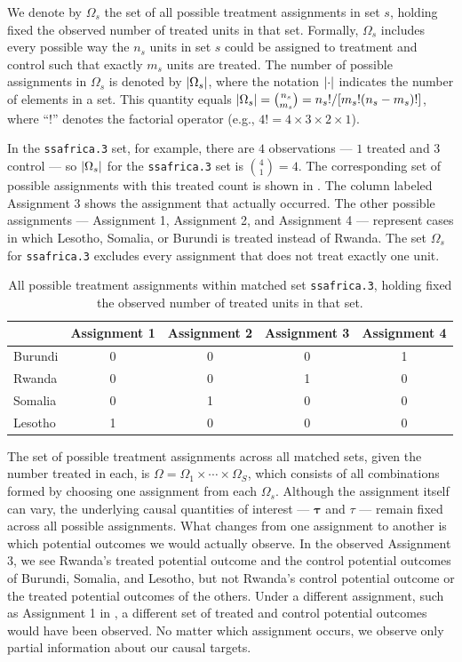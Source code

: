 \documentclass[twoside,11pt]{article}
\DeclarePairedDelimiter\abs{\lvert}{\rvert}
\begin{document}
We denote by \(\Omega_s\) the set of all possible treatment assignments
in set \(s\), holding fixed the observed number of treated units in that
set. Formally, \(\Omega_s\) includes every possible way the \(n_s\)
units in set \(s\) could be assigned to treatment and control such that
exactly \(m_s\) units are treated. The number of possible assignments in
\(\Omega_s\) is denoted by \(\abs{\Omega_s}\), where the notation
\(\abs{\cdot}\) indicates the number of elements in a set. This quantity
equals
\(\abs{\Omega_s} = \binom{n_s}{m_s} = n_s! / [m_s! (n_s - m_s)!]\),
where ``!'' denotes the factorial operator (e.g.,
\(4! = 4 \times 3 \times 2 \times 1\)).

In the \texttt{ssafrica.3} set, for example, there are \(4\)
observations --- \(1\) treated and \(3\) control --- so
\(\abs{\Omega_s}\) for the \texttt{ssafrica.3} set is
\(\binom{4}{1} = 4\). The corresponding set of possible assignments with
this treated count is shown in .
The column labeled Assignment 3 shows the assignment that actually
occurred. The other possible assignments --- Assignment 1, Assignment 2,
and Assignment 4 --- represent cases in which Lesotho, Somalia, or
Burundi is treated instead of Rwanda. The set \(\Omega_s\) for
\texttt{ssafrica.3} excludes every assignment that does not treat
exactly one unit.

\begin{table}[htbp]
\centering
\begin{tabular}{l|cccc}
\hline
 & Assignment 1 & Assignment 2 & Assignment 3 & Assignment 4
 \\
\hline
Burundi & 0 & 0 & 0 & 1 \\
Rwanda & 0 & 0 & 1 & 0 \\
Somalia & 0 & 1 & 0 & 0 \\
Lesotho & 1 & 0 & 0 & 0 \\
\hline
\end{tabular}
\caption{All possible treatment assignments within matched set \texttt{ssafrica.3}, holding fixed the observed number of treated units in that set.}
\label{tab: ssafrica.3 assignments}
\end{table}

The set of possible treatment assignments across all matched sets, given
the number treated in each, is
\(\Omega = \Omega_1 \times \cdots \times \Omega_S\), which consists of all
combinations formed by choosing one assignment from each
\(\Omega_s\). Although the assignment itself can vary, the underlying causal
quantities of interest --- \(\bm{\tau}\) and \(\tau\) --- remain fixed
across all possible assignments. What changes from one assignment to
another is which potential outcomes we would actually observe. In the
observed Assignment 3, we see Rwanda's treated potential outcome and the
control potential outcomes of Burundi, Somalia, and Lesotho, but not
Rwanda's control potential outcome or the treated potential outcomes of
the others. Under a different assignment, such as Assignment 1 in
, a different set of treated and
control potential outcomes would have been observed. No matter which
assignment occurs, we observe only partial information about our causal
targets.
\end{document}
